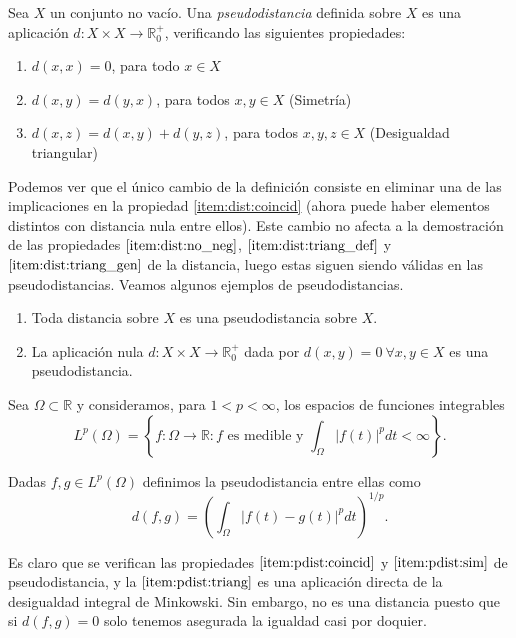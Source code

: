 \begin{definition}[Pseudodistancia]
    Sea $X$ un conjunto no vacío. Una \emph{pseudodistancia} definida sobre $X$ es una aplicación $d:X\times X \to \mathbb{R}^{+}_{0}$, verificando las siguientes propiedades:
    
    \begin{enumerate}
        \item $d(x,x)=0$, para todo $x \in X$ \label{item:pdist:coincid}
        \item $d(x,y)=d(y,x)$, para todos $x,y \in X$ (Simetría) \label{item:pdist:sim} 
        \item $d(x,z)=d(x,y)+d(y,z)$, para todos $x,y,z \in X$ (Desigualdad triangular) \label{item:pdist:triang}
    \end{enumerate}
    
\end{definition}

Podemos ver que el único cambio de la definición consiste en eliminar una de las implicaciones en la propiedad \ref{item:dist:coincid} (ahora puede haber elementos distintos con distancia nula entre ellos). Este cambio no afecta a la demostración de las propiedades $\ref{item:dist:no_neg}$, $\ref{item:dist:triang_def}$ y $\ref{item:dist:triang_gen}$ de la distancia, luego estas siguen siendo válidas en las pseudodistancias. Veamos algunos ejemplos de pseudodistancias.

\begin{example}
    \begin{enumerate}
        \item Toda distancia sobre $X$ es una pseudodistancia sobre $X$.
        \item La aplicación nula $d:X\times X \to \mathbb{R}^+_0$ dada por $d(x,y) = 0 \ \forall x,y \in X$ es una pseudodistancia.
    \end{enumerate}
\end{example}

\begin{example}

Sea $\Omega \subset \mathbb{R}$ y consideramos, para $1 < p < \infty$, los espacios de funciones integrables 
\[L^p(\Omega)=\left\{f\colon\Omega \to \mathbb{R} \colon f \text{ es medible y } \int_{\Omega} |f(t)|^p dt < \infty \right\}.\]

Dadas $f,g \in L^p(\Omega)$ definimos la pseudodistancia entre ellas como \[d(f,g)=\left(\int_{\Omega}|f(t)-g(t)|^p dt\right)^{1/p}.\]

Es claro que se verifican las propiedades $\ref{item:pdist:coincid}$ y $\ref{item:pdist:sim}$ de pseudodistancia, y la $\ref{item:pdist:triang}$ es una aplicación directa de la desigualdad integral de Minkowski. Sin embargo, no es una distancia puesto que si $d(f,g)=0$ solo tenemos asegurada la igualdad casi por doquier.

\end{example}

